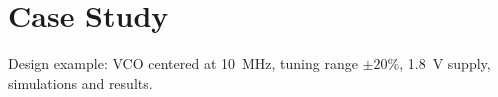 \chapter{Case Study}
Design example: VCO centered at \SI{10}{\mega\hertz}, tuning range \(\pm20\%\), \SI{1.8}{\volt} supply, simulations and results.


